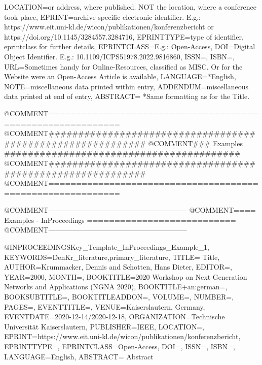 {    LOCATION={or address, where published. NOT the location, where a conference took place},
    EPRINT={archive-specific electronic identifier. E.g.: https://www.eit.uni-kl.de/wicon/publikationen/konferenzbericht   or   https://doi.org/10.1145/3284557.3284716},
    EPRINTTYPE={type of identifier, eprintclass for further details},
    EPRINTCLASS={E.g.: Open-Access},
    DOI={Digital Object Identifier. E.g.: 10.1109/ICPS51978.2022.9816860},
    ISSN={},
    ISBN={},
    URL={Sometimes handy for Online-Resources, classified as MISC. Or for the Website were an Open-Access Article is available},
    LANGUAGE={*English},
    NOTE={miscellaneous data printed within entry},
    ADDENDUM={miscellaneous data printed at end of entry},
    ABSTRACT={\begingroup
        *Same formatting as for the Title.\endgroup}
}












@COMMENT{===========================================================}
@COMMENT{###########################################################}
@COMMENT{###    Examples    ########################################}
@COMMENT{###########################################################}
@COMMENT{===========================================================}


@COMMENT{-----------------------------------------------------------}
@COMMENT{====  Examples - InProceedings  ===========================}
@COMMENT{-----------------------------------------------------------}

@INPROCEEDINGS{Key_Template_InProceedings_Example_1,
    KEYWORDS={DenKr_literature,primary_literature},
    TITLE={\begingroup
        Title\endgroup},
    AUTHOR={Krummacker, Dennis and Schotten, Hans Dieter},
    EDITOR={},
    YEAR={2000},
    MONTH={},
    BOOKTITLE={2020 Workshop on Next Generation Networks and Applications (NGNA 2020)},
    BOOKTITLE+an:german={},
    BOOKSUBTITLE={},
    BOOKTITLEADDON={},
    VOLUME={},
    NUMBER={},
    PAGES={},
    EVENTTITLE={},
    VENUE={Kaiserslautern, Germany},
    EVENTDATE={2020-12-14/2020-12-18},
    ORGANIZATION={Technische Universit{\"a}t Kaiserslautern},
    PUBLISHER={IEEE},
    LOCATION={},
    EPRINT={https://www.eit.uni-kl.de/wicon/publikationen/konferenzbericht},
    EPRINTTYPE={},
    EPRINTCLASS={Open-Access},
    DOI={},
    ISSN={},
    ISBN={},
    LANGUAGE={English},
    ABSTRACT={\begingroup
        Abstract\endgroup}
}

